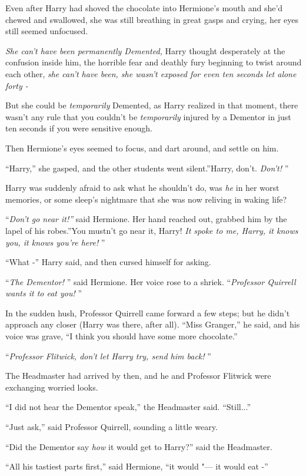 Even after Harry had shoved the chocolate into Hermione's mouth and
she'd chewed and swallowed, she was still breathing in great gasps and
crying, her eyes still seemed unfocused.

\emph{She can't have been permanently Demented,} Harry thought
desperately at the confusion inside him, the horrible fear and deathly
fury beginning to twist around each other, \emph{she can't have been,
she wasn't exposed for even ten seconds let alone forty -}

But she could be \emph{temporarily} Demented, as Harry realized in that
moment, there wasn't any rule that you couldn't be \emph{temporarily}
injured by a Dementor in just ten seconds if you were sensitive enough.

Then Hermione's eyes seemed to focus, and dart around, and settle on
him.

``Harry,'' she gasped, and the other students went silent.''Harry,
don't. \emph{Don't!} ''

Harry was suddenly afraid to ask what he shouldn't do, was \emph{he} in
her worst memories, or some sleep's nightmare that she was now reliving
in waking life?

``\emph{Don't go near it!''} said Hermione. Her hand reached out, grabbed
him by the lapel of his robes.''You mustn't go near it, Harry! \emph{It
spoke to me, Harry, it knows you, it knows you're here!} ''

``What -'' Harry said, and then cursed himself for asking.

``\emph{The Dementor!} '' said Hermione. Her voice rose to a shriek.
``\emph{Professor Quirrell wants it to eat you!} ''

In the sudden hush, Professor Quirrell came forward a few steps; but he
didn't approach any closer (Harry was there, after all). ``Miss
Granger,'' he said, and his voice was grave, ``I think you should have
some more chocolate.''

``\emph{Professor Flitwick, don't let Harry try, send him back!} ''

The Headmaster had arrived by then, and he and Professor Flitwick were
exchanging worried looks.

``I did not hear the Dementor speak,'' the Headmaster said.
``Still...''

``Just ask,'' said Professor Quirrell, sounding a little weary.

``Did the Dementor say \emph{how} it would get to Harry?'' said the
Headmaster.

``All his tastiest parts first,'' said Hermione, ``it would "--- it would
eat -''

